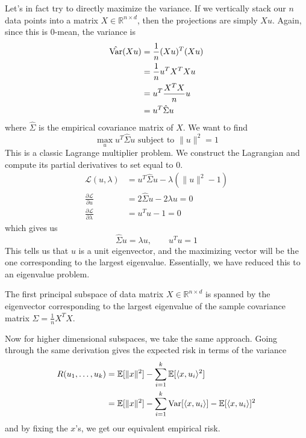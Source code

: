   Let's in fact try to directly maximize the variance. If we vertically stack our $n$ data points into a matrix $X \in \mathbb{R}^{n \times d}$, then the projections are simply $X u$. Again, since this is $0$-mean, the variance is 
  \begin{align}
    \hat{\operatorname{Var}}(Xu) 
    & = \frac{1}{n} (Xu)^T (Xu) \\ 
    & = \frac{1}{n} u^T X^T X u \\
    & = u^T \frac{X^T X}{n} u \\ 
    & = u^T \hat{\Sigma} u
  \end{align}
  where $\hat{\Sigma}$ is the empirical covariance matrix of $X$. We want to find 
  \begin{equation}
    \max_{u} u^T \hat{\Sigma} u \text{ subject to } \|u\|^2 = 1
  \end{equation} 
  This is a classic Lagrange multiplier problem. We construct the Lagrangian and compute its partial derivatives to set equal to $0$. 
  \begin{align}
    \mathcal{L}(u, \lambda) & = u^T \hat{\Sigma} u - \lambda (\|u\|^2 - 1) \\  
    \frac{\partial \mathcal{L}}{\partial u} & = 2 \hat{\Sigma} u - 2 \lambda u = 0 \\ 
    \frac{\partial \mathcal{L}}{\partial \lambda} & = u^T u - 1 = 0
  \end{align} 
  which gives us 
  \begin{equation}
    \hat{\Sigma} u = \lambda u, \qquad u^T u = 1
  \end{equation} 
  This tells us that $u$ is a unit eigenvector, and the maximizing vector will be the one corresponding to the largest eigenvalue. Essentially, we have reduced this to an eigenvalue problem. 
  
  \begin{theorem}
    The first principal subspace of data matrix $X \in \mathbb{R}^{n \times d}$ is spanned by the eigenvector corresponding to the largest eigenvalue of the sample covariance matrix $\hat{\Sigma} = \frac{1}{n} X^T X$. 
  \end{theorem}

  Now for higher dimensional subspaces, we take the same approach. Going through the same derivation gives the expected risk in terms of the variance 
  \begin{align}
    R(u_1, \ldots, u_k) 
    & = \mathbb{E}[\|x\|^2] - \sum_{i=1}^k \mathbb{E}[ \langle x, u_i \rangle^2 ] \\ 
    & = \mathbb{E}[\|x\|^2] - \sum_{i=1}^k \operatorname{Var}[\langle x, u_i \rangle ] - \mathbb{E}[ \langle x, u_i \rangle ]^2 
  \end{align}
  and by fixing the $x$'s, we get our equivalent empirical risk. 

